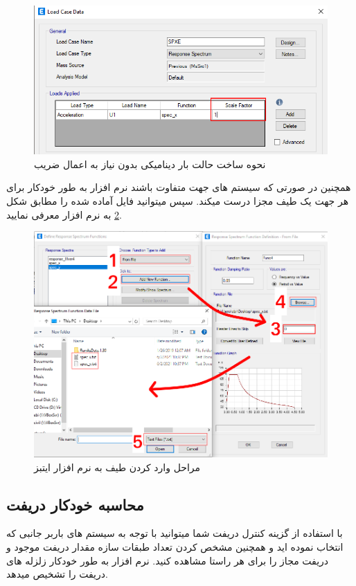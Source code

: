 \begin{figure}[H]
    \centering
    \includegraphics[scale=.7]{figures/spec_scale.png}
    \caption{نحوه ساخت حالت بار دینامیکی بدون نیاز به اعمال ضریب}
    \label{pic:spec_scale}
\end{figure}

همچنین در صورتی که سیستم های جهت 
متفاوت باشند نرم افزار به طور خودکار برای هر جهت یک طیف مجزا درست میکند. سپس میتوانید فایل آماده شده را مطابق شکل
\ref{pic:spec}
به نرم افزار معرفی نمایید.

\begin{figure}[H]
    \centering
    \includegraphics[scale=.6]{figures/spec}
    \caption{مراحل وارد کردن طیف به نرم افزار ایتبز}
    \label{pic:spec}
\end{figure}

\subsection{محاسبه خودکار دریفت}
با استفاده از گزینه کنترل دریفت شما میتوانید با توجه به سیستم های باربر جانبی که انتخاب نموده اید و همچنین مشخص کردن تعداد طبقات سازه مقدار دریفت موجود و دریفت مجاز را برای هر راستا مشاهده کنید.
نرم افزار به طور خودکار زلزله های دریفت را تشخیص میدهد.

